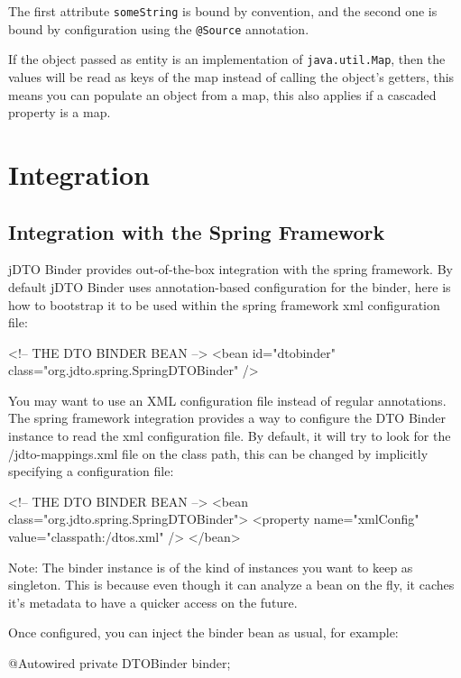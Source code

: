 \documentclass[11pt]{article}
\newcommand{\JDTO}{jDTO Binder\xspace}
\newcommand{\DEFAULTCONFIG}{/jdto-mappings.xml\xspace}
\begin{document}
The first attribute \texttt{someString} is bound by convention, and the second one is bound
by configuration using the \texttt{@Source} annotation.

If the object passed as entity is an implementation of \texttt{java.util.Map}, then the values will be read as keys of the map instead of calling the object's getters, this means you can populate an object from a map, this also applies if a cascaded property is a map. 

\section{Integration}

\subsection{Integration with the Spring Framework}

\JDTO provides out-of-the-box integration with the spring framework. By default \JDTO uses annotation-based configuration for the binder, here is how to bootstrap it to be used within the spring framework xml configuration file:


\begin{xml}
<!-- THE DTO BINDER BEAN --> 
<bean id="dtobinder" 
    class="org.jdto.spring.SpringDTOBinder" />
\end{xml}


You may want to use an XML configuration file instead of regular annotations. The spring framework integration
provides a way to configure the DTO Binder instance to read the xml configuration file. By default, it will try to look for the \DEFAULTCONFIG file on the class path, this can be changed by implicitly specifying a configuration file:


\begin{xml}
<!-- THE DTO BINDER BEAN --> 
<bean class="org.jdto.spring.SpringDTOBinder">
    <property name="xmlConfig" value="classpath:/dtos.xml" />
</bean>
\end{xml}


Note: The binder instance is of the kind of instances you want to keep as singleton. This is because even though it can analyze a bean on the fly, it caches it's metadata to have a quicker access on the future.

Once configured, you can inject the binder bean as usual, for example:


\begin{java}
@Autowired
private DTOBinder binder;
\end{java}
\end{document}
